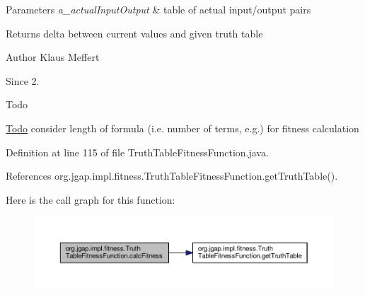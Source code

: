 \begin{DoxyParams}{Parameters}
{\em a\-\_\-actual\-Input\-Output} & table of actual input/output pairs \\
\hline
\end{DoxyParams}
\begin{DoxyReturn}{Returns}
delta between current values and given truth table
\end{DoxyReturn}
\begin{DoxyAuthor}{Author}
Klaus Meffert 
\end{DoxyAuthor}
\begin{DoxySince}{Since}
2. 
\end{DoxySince}
\begin{DoxyRefDesc}{Todo}
\item[\hyperlink{todo__todo000163}{Todo}]consider length of formula (i.\-e. number of terms, e.\-g.) for fitness calculation \end{DoxyRefDesc}


Definition at line 115 of file Truth\-Table\-Fitness\-Function.\-java.



References org.\-jgap.\-impl.\-fitness.\-Truth\-Table\-Fitness\-Function.\-get\-Truth\-Table().



Here is the call graph for this function\-:
\nopagebreak
\begin{figure}[H]
\begin{center}
\leavevmode
\includegraphics[width=350pt]{classorg_1_1jgap_1_1impl_1_1fitness_1_1_truth_table_fitness_function_acd41df30587d5553bf61293c0e025051_cgraph}
\end{center}
\end{figure}


